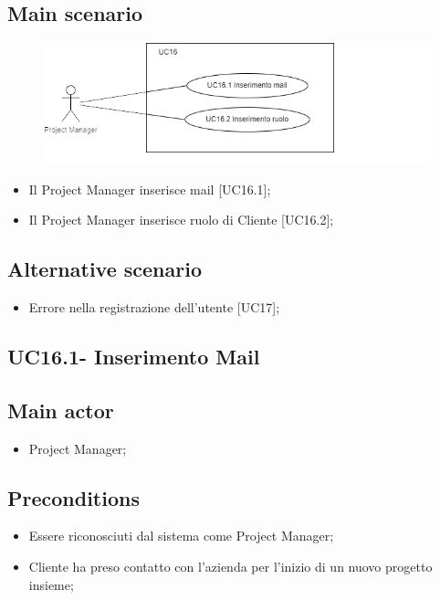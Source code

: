 \documentclass{article}
\begin{document}
    \subsection*{Main scenario}
        \begin{figure}[h]
          \centering
          \includegraphics{documenti/imgUML/UC16-zoom.png}
          \label{fig:immagine}
        \end{figure}
        
        \begin{itemize}
            \item Il Project Manager inserisce mail [UC16.1];
            \item Il Project Manager inserisce ruolo di Cliente [UC16.2];
        \end{itemize}
        
    \subsection*{Alternative scenario}
        \begin{itemize}
            \item Errore nella registrazione dell'utente [UC17];
        \end{itemize}

    \subsection{UC16.1- Inserimento Mail}
    \subsection*{Main actor}
        \begin{itemize}
            \item Project Manager;
        \end{itemize}
        
    \subsection*{Preconditions}
        \begin{itemize}
            \item Essere riconosciuti dal sistema come Project Manager;
            \item Cliente ha preso contatto con l'azienda per l'inizio di un nuovo progetto insieme;
        \end{itemize}
        
\end{document}
